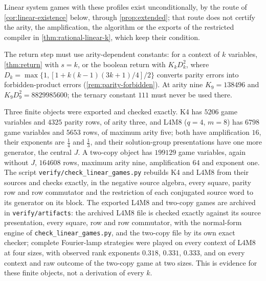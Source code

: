 Linear system games with these profiles exist unconditionally, by the route of \cref{cor:linear-existence} below, through
\cref{prop:extended}; that route does not certify the arity, the amplification, the algorithm or the exports of the restricted
compiler in \cref{thm:rational-linear-k}, which keep their condition.

The return step must use arity-dependent constants: for a context of $k$ variables, \cref{thm:return} with $s=k$, or the
boolean return with $K_kD_k^2$, where $D_k=\max\{1,[1+k(k-1)(3k+1)/4]/2\}$ converts parity errors into forbidden-product
errors (\cref{rem:parity-forbidden}). At arity nine $K_9=138496$ and $K_9D_9^2=8829985600$; the ternary constant $111$ must
never be used there.

\begin{remark}\label{rem:exports}
Three finite objects were exported and checked exactly. K4 has $5206$ game variables and $4325$ parity rows, of arity three,
and L4M8 ($q=4$, $m=8$) has $6798$ game variables and $5653$ rows, of maximum arity five; both have amplification $16$, their
exponents are $\frac14$ and $\frac13$, and their solution-group presentations have one more generator, the central $J$. A
two-copy object has $199129$ game variables, again without $J$, $164608$ rows, maximum arity nine, amplification $64$ and
exponent one. The script \texttt{verify/check\_linear\_games.py} rebuilds K4 and L4M8 from their sources and checks exactly, in
the negative source algebra, every square, parity row and row commutator and the restriction of each conjugated source word to
its generator on its block. The exported L4M8 and two-copy games are archived in \texttt{verify/artifacts}: the archived L4M8
file is checked exactly against its source presentation, every square, row and row commutator, with the normal-form engine of
\texttt{check\_linear\_games.py}, and the two-copy file by its own exact checker; complete Fourier-lamp strategies were played on every
context of L4M8 at four sizes, with observed rank exponents $0.318$, $0.331$, $0.333$, and on every context and raw outcome of the
two-copy game at two sizes.
This is evidence for these finite objects, not a derivation of every $k$.
\end{remark}

